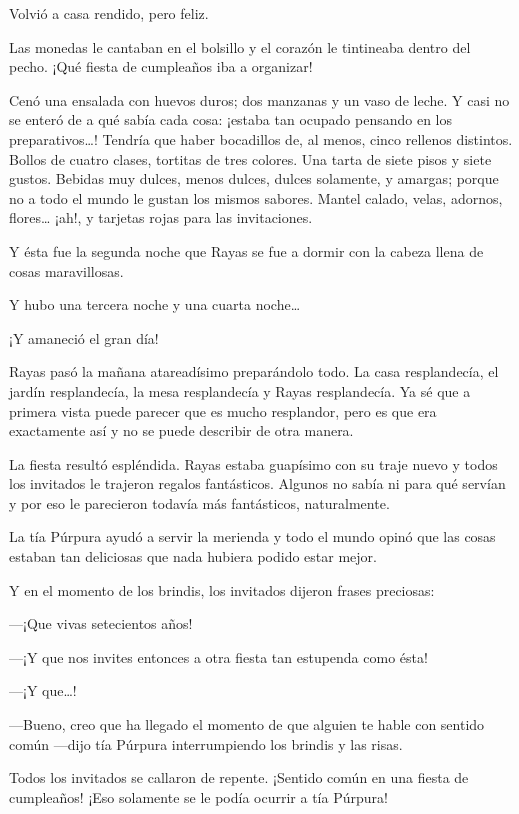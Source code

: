 \documentclass{barcodevapor3pags}
\begin{document}
Volvió a casa rendido, pero feliz.

Las monedas le cantaban en el bolsillo y el corazón le tintineaba dentro
del pecho. ¡Qué fiesta de cumpleaños iba a organizar!

Cenó una ensalada con huevos duros; dos manzanas y un vaso de leche. Y
casi no se enteró de a qué sabía cada cosa: ¡estaba tan ocupado pensando
en los preparativos\ldots! Tendría que haber bocadillos de, al menos,
cinco rellenos distintos. Bollos de cuatro clases, tortitas de tres
colores. Una tarta de siete pisos y siete gustos. Bebidas muy dulces,
menos dulces, dulces solamente, y amargas; porque no a todo el mundo le
gustan los mismos sabores. Mantel calado, velas, adornos, flores\ldots{}
¡ah!, y tarjetas rojas para las invitaciones.

Y ésta fue la segunda noche que Rayas se fue a dormir con la cabeza
llena de cosas maravillosas.

Y hubo una tercera noche y una cuarta noche\ldots{}

¡Y amaneció el gran día!

Rayas pasó la mañana atareadísimo preparándolo todo. La casa
resplandecía, el jardín resplandecía, la mesa resplandecía y Rayas
resplandecía. Ya sé que a primera vista puede parecer que es mucho
resplandor, pero es que era exactamente así y no se puede describir de
otra manera.

La fiesta resultó espléndida. Rayas estaba guapísimo con su traje nuevo
y todos los invitados le trajeron regalos fantásticos. Algunos no sabía
ni para qué servían y por eso le parecieron todavía más fantásticos,
naturalmente.

La tía Púrpura ayudó a servir la merienda y todo el mundo opinó que las
cosas estaban tan deliciosas que nada hubiera podido estar mejor.

Y en el momento de los brindis, los invitados dijeron frases preciosas:

---¡Que vivas setecientos años!

---¡Y que nos invites entonces a otra fiesta tan estupenda como ésta!

---¡Y que\ldots!

---Bueno, creo que ha llegado el momento de que alguien te hable con
sentido común ---dijo tía Púrpura interrumpiendo los brindis y las
risas.

Todos los invitados se callaron de repente. ¡Sentido común en una fiesta
de cumpleaños! ¡Eso solamente se le podía ocurrir a tía Púrpura!
\end{document}
